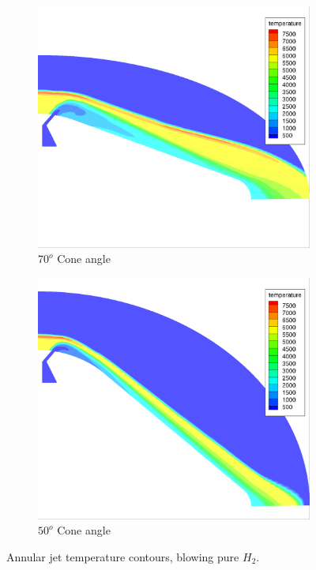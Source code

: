 \begin{figure}[h!]
  \centering
  \begin{subfigure}{0.45\textwidth}
    \includegraphics[width=\textwidth]{figures/srp/70deg-temperature.png}
    \caption{$70^o$ Cone angle}
    \label{fig:70deg-temperature-contour}
  \end{subfigure}
  \begin{subfigure}{0.45\textwidth}
    \includegraphics[width=\textwidth]{figures/srp/50deg-temperature.png}
    \caption{$50^o$ Cone angle}
    \label{fig:50deg-temperature-contour}
  \end{subfigure}
  \caption{Annular jet temperature contours, blowing pure $H_2$.}
  \label{fig:cone-angle-temperature}
\end{figure}

